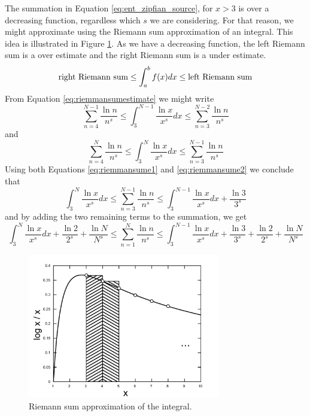 The summation in Equation \ref{eq:ent_zipfian_source}, for $x > 3$ is over a decreasing
function, regardless which $s$ we are considering. For that reason, we might approximate
using the Riemann sum approximation of an integral. This idea is illustrated in 
Figure \ref{fig:logk_k_integral}. As we have a decreasing function, the left Riemann sum
is a over estimate and the right Riemann sum is a under estimate.
\begin{equation}
\label{eq:riemmansumestimate}
\textmd{right Riemann sum} \leq \int_{a}^{b} f(x) dx \leq \textmd{left Riemann sum}
\end{equation} 
From Equation \ref{eq:riemmansumestimate} we might write
\begin{equation}
\label{eq:riemmansume1}
\sum_{n=4}^{N-1} \frac{\ln n}{n^s} \leq \int_{3}^{N-1} \frac{\ln x}{x^s} dx \leq \sum_{n=3}^{N-2} \frac{\ln n}{n^s}
\end{equation}
and
\begin{equation}
\label{eq:riemmansume2}
\sum_{n=4}^{N} \frac{\ln n}{n^s} \leq \int_{3}^{N} \frac{\ln x}{x^s} dx \leq \sum_{n=3}^{N-1} \frac{\ln n}{n^s}
\end{equation}
Using both Equations \ref{eq:riemmansume1} and \ref{eq:riemmansume2} we conclude that
\begin{equation}
\label{eq:riemmansume12}
\int_{3}^{N} \frac{\ln x}{x^s} dx \leq \sum_{n=3}^{N-1} \frac{\ln n}{n^s} \leq \int_{3}^{N-1} \frac{\ln x}{x^s} dx + \frac{\ln 3}{3^s}
\end{equation}
and by adding the two remaining terms to the summation, we get
\begin{equation}
\label{eq:riemmansume12f}
\int_{3}^{N} \frac{\ln x}{x^s} dx + \frac{\ln 2}{2^s} + \frac{\ln N}{N^s} \leq \sum_{n=1}^{N} \frac{\ln n}{n^s} \leq \int_{3}^{N-1} \frac{\ln x}{x^s} dx + \frac{\ln 3}{3^s} + \frac{\ln 2}{2^s} + \frac{\ln N}{N^s}
\end{equation}


\begin{figure}[htbp]
\centering
\includegraphics[width=0.75\textwidth]{images/logk_k_integral.pdf}
\caption{Riemann sum approximation of the integral.}
\label{fig:logk_k_integral}
\end{figure}

